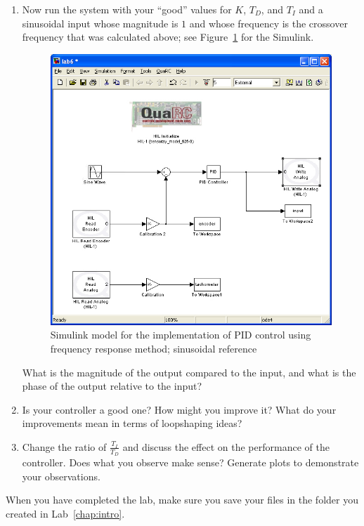 \begin{enumerate}
    \item Now run the system with your ``good'' values for \(K\), \(T_D\), and
          \(T_I\) and a sinusoidal input whose magnitude is \(1\) and whose frequency is
          the crossover frequency that was calculated above; see
          Figure~\ref{fig:model9} for the \textsf{Simulink}\@.
          \begin{figure}[htbp]
              \centering
              \includegraphics[width=0.6\hsize]{pix/lab9.jpg}
              \caption{\textsf{Simulink} model for the implementation of PID control using
                  frequency response method; sinusoidal reference}\label{fig:model9}
          \end{figure}%
          What is the magnitude of the output compared to the input, and what is the
          phase of the output relative to the input?

    \item Is your controller a good one?  How might you improve it?  What do your
          improvements mean in terms of loopshaping ideas?

    \item Change the ratio of \(\frac{T_{I}}{T_{D}}\) and discuss the effect on the
          performance of the controller.  Does what you observe make sense?  Generate
          plots to demonstrate your observations.
\end{enumerate}

When you have completed the lab, make sure you save your files in the folder
you created in Lab~\ref{chap:intro}\@.

